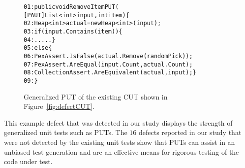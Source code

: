\begin{figure}[t]
\begin{CodeOut}
\begin{alltt}
01: public void RemoveItemPUT(
\hspace*{0.7in} [PAUT]List<int> input, int item) \{
02: \hspace*{0.07in}Heap<int> actual = new Heap<int> (input);
03: \hspace*{0.07in}if (input.Contains(item)) \{
04: \hspace*{0.2in}..... \}
05: \hspace*{0.07in}else \{
06: \hspace*{0.2in}PexAssert.IsFalse(actual.Remove(randomPick));
07: \hspace*{0.2in}PexAssert.AreEqual(input.Count, actual.Count);
08: \hspace*{0.2in}CollectionAssert.AreEquivalent(actual, input);\}
09: \hspace*{0.02in}\}
\end{alltt}
\end{CodeOut}
\caption{Generalized PUT of the existing CUT shown in Figure~\ref{fig:defectCUT}.}
\label{fig:defectPUT} 
\end{figure}

This example defect that was detected in our study displays the strength of generalized unit tests such as PUTs. The $16$ defects reported in our study that were not detected by the existing unit tests show that PUTs can assist in an unbiased test generation and are an effective means for rigorous testing of the code under test.  
%
%

